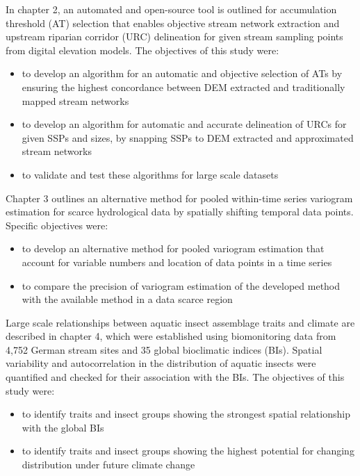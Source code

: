 In chapter 2, an automated and open-source tool is outlined for accumulation threshold (AT) selection that enables objective stream network extraction and upstream riparian corridor (URC) delineation for given stream sampling points from digital elevation models. The objectives of this study were:

\begin{itemize}
\item to develop an algorithm for an automatic and objective selection of ATs by ensuring the highest concordance between DEM extracted and traditionally mapped stream networks
\item to develop an algorithm for automatic and accurate delineation of URCs for given SSPs and sizes, by snapping SSPs to DEM extracted and approximated stream networks
\item to validate and test these algorithms for large scale datasets
\end{itemize}

Chapter 3 outlines an alternative method for pooled within-time series variogram estimation for scarce hydrological data by spatially shifting temporal data points. Specific objectives were:

\begin{itemize}
\item to develop an alternative method for pooled variogram estimation that account for variable numbers and location of data points in a time series
\item to compare the precision of variogram estimation of the developed method with the available method in a data scarce region
\end{itemize}

Large scale relationships between aquatic insect assemblage traits and climate are described in chapter 4, which were established using biomonitoring data from 4,752 German stream sites and 35 global bioclimatic indices (BIs). Spatial variability and autocorrelation in the distribution of aquatic insects were quantified and checked for their association with the BIs. The objectives of this study were:

\begin{itemize}
\item to identify traits and insect groups showing the strongest spatial relationship with the global BIs
\item to identify traits and insect groups showing the highest potential for changing distribution under future climate change
\end{itemize}

